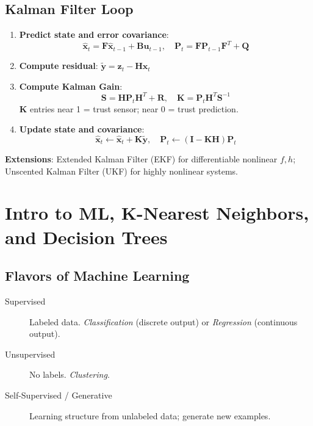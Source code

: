 \documentclass[11pt]{article}
\begin{document}
\subsection{Kalman Filter Loop}

\begin{enumerate}
  \item \textbf{Predict state and error covariance}:
    \[
      \hat{\mathbf{x}}_t = \mathbf{F}\hat{\mathbf{x}}_{t-1} + \mathbf{B}\mathbf{u}_{t-1}, \quad
      \mathbf{P}_t = \mathbf{F}\mathbf{P}_{t-1}\mathbf{F}^T + \mathbf{Q}
    \]
  \item \textbf{Compute residual}: $\tilde{\mathbf{y}} = \mathbf{z}_t - \mathbf{H}\hat{\mathbf{x}}_t$
  \item \textbf{Compute Kalman Gain}:
    \[
      \mathbf{S} = \mathbf{H}\mathbf{P}_t\mathbf{H}^T + \mathbf{R}, \quad \mathbf{K} = \mathbf{P}_t\mathbf{H}^T\mathbf{S}^{-1}
    \]
    $\mathbf{K}$ entries near 1 = trust sensor; near 0 = trust prediction.
  \item \textbf{Update state and covariance}:
    \[
      \hat{\mathbf{x}}_t \leftarrow \hat{\mathbf{x}}_t + \mathbf{K}\tilde{\mathbf{y}}, \quad
      \mathbf{P}_t \leftarrow (\mathbf{I} - \mathbf{K}\mathbf{H})\mathbf{P}_t
    \]
\end{enumerate}

\textbf{Extensions}: Extended Kalman Filter (EKF) for differentiable nonlinear $f, h$; Unscented Kalman Filter (UKF) for highly nonlinear systems.

\section{Intro to ML, K-Nearest Neighbors, and Decision Trees}

\subsection{Flavors of Machine Learning}
\begin{description}
  \item[Supervised] Labeled data. \textit{Classification} (discrete output) or \textit{Regression} (continuous output).
  \item[Unsupervised] No labels. \textit{Clustering}.
  \item[Self-Supervised / Generative] Learning structure from unlabeled data; generate new examples.
\end{description}
\end{document}
